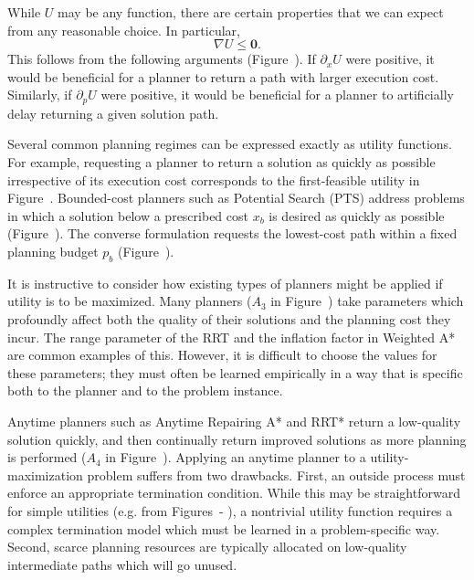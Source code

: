 While $U$ may be any function,
there are certain properties that we can expect from any reasonable
choice.
In particular,
\begin{equation}
   \nabla U \leq \mathbf{0}.
\end{equation}
This follows from the following arguments
(Figure~).
If $\partial_x U$ were positive,
it would be beneficial for a planner to return a path with larger
execution cost.
Similarly,
if $\partial_p U$ were positive,
it would be beneficial for a planner to artificially delay returning
a given solution path.


Several common planning regimes can be expressed exactly as
utility functions.
For example,
requesting a planner to return a solution as quickly as possible
irrespective of its execution cost corresponds to the first-feasible
utility in Figure~.
Bounded-cost planners such as Potential Search (PTS) \citep{stern2014}
address problems in which a solution below a prescribed cost $x_b$ is
desired as quickly as possible (Figure~).
The converse formulation requests the lowest-cost path
within a fixed planning budget $p_b$
(Figure~).

It is instructive to consider how existing types of planners
might be applied if utility is to be maximized.
Many planners
($A_3$ in Figure~)
take parameters which profoundly affect both the
quality of their solutions and the planning cost they incur.
The range parameter of the RRT \citep{lavallekuffner1999rrt}
and the inflation factor in Weighted A* \citep{pohl1970weightedastar}
are common examples of this.
However,
it is difficult to choose the values for these parameters;
they must often be learned empirically in a way that is
specific both to the planner and to the problem instance.

Anytime planners such as
Anytime Repairing A* \citep{likhachev2004arastar}
and RRT* \citep{karaman2010rrtstar}
return a low-quality solution quickly,
and then continually return improved solutions as more planning
is performed ($A_4$ in Figure~).
Applying an anytime planner to a utility-maximization problem suffers
from two drawbacks.
First,
an outside process must enforce an appropriate termination condition.
While this may be straightforward for simple utilities
(e.g. from Figures~-%
),
a nontrivial utility function requires a complex termination model
which must be learned in a problem-specific way.
Second,
scarce planning resources are typically allocated on low-quality
intermediate paths which will go unused.

